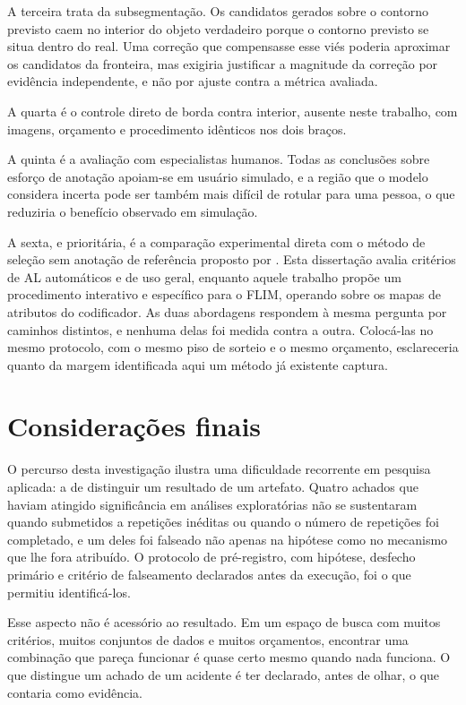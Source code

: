 A terceira trata da subsegmentação. Os candidatos gerados sobre o contorno previsto caem no interior do objeto verdadeiro porque o contorno previsto se situa dentro do real. Uma correção que compensasse esse viés poderia aproximar os candidatos da fronteira, mas exigiria justificar a magnitude da correção por evidência independente, e não por ajuste contra a métrica avaliada.

A quarta é o controle direto de borda contra interior, ausente neste trabalho, com imagens, orçamento e procedimento idênticos nos dois braços.

A quinta é a avaliação com especialistas humanos. Todas as conclusões sobre esforço de anotação apoiam-se em usuário simulado, e a região que o modelo considera incerta pode ser também mais difícil de rotular para uma pessoa, o que reduziria o benefício observado em simulação.

A sexta, e prioritária, é a comparação experimental direta com o método de seleção sem anotação de referência proposto por \cite{cerqueira2024gtfree}. Esta dissertação avalia critérios de \ac{AL} automáticos e de uso geral, enquanto aquele trabalho propõe um procedimento interativo e específico para o \ac{FLIM}, operando sobre os mapas de atributos do codificador. As duas abordagens respondem à mesma pergunta por caminhos distintos, e nenhuma delas foi medida contra a outra. Colocá-las no mesmo protocolo, com o mesmo piso de sorteio e o mesmo orçamento, esclareceria quanto da margem identificada aqui um método já existente captura.

\section{Considerações finais}

O percurso desta investigação ilustra uma dificuldade recorrente em pesquisa aplicada: a de distinguir um resultado de um artefato. Quatro achados que haviam atingido significância em análises exploratórias não se sustentaram quando submetidos a repetições inéditas ou quando o número de repetições foi completado, e um deles foi falseado não apenas na hipótese como no mecanismo que lhe fora atribuído. O protocolo de pré-registro, com hipótese, desfecho primário e critério de falseamento declarados antes da execução, foi o que permitiu identificá-los.

Esse aspecto não é acessório ao resultado. Em um espaço de busca com muitos critérios, muitos conjuntos de dados e muitos orçamentos, encontrar uma combinação que pareça funcionar é quase certo mesmo quando nada funciona. O que distingue um achado de um acidente é ter declarado, antes de olhar, o que contaria como evidência.
